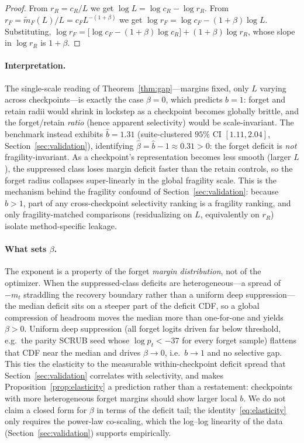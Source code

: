 \begin{proof}
From $r_R = c_R/L$ we get $\log L = \log c_R - \log r_R$. From
$r_F = \tilde m_F(L)/L = c_F L^{-(1+\beta)}$ we get
$\log r_F = \log c_F - (1+\beta)\log L$. Substituting,
$\log r_F = \bigl[\log c_F - (1+\beta)\log c_R\bigr] + (1+\beta)\log r_R$,
whose slope in $\log r_R$ is $1+\beta$.
\end{proof}

\paragraph{Interpretation.} The single-scale reading of
Theorem~\ref{thm:gap}---margins fixed, only $L$ varying across
checkpoints---is exactly the case $\beta = 0$, which predicts $b=1$: forget and
retain radii would shrink in lockstep as a checkpoint becomes globally
brittle, and the forget/retain \emph{ratio} (hence apparent selectivity) would
be scale-invariant. The benchmark instead exhibits $\hat b = 1.31$
(suite-clustered $95\%$ CI $[1.11,2.04]$, Section~\ref{sec:validation}),
identifying $\hat\beta = \hat b - 1 \approx 0.31 > 0$: the forget deficit is
\emph{not} fragility-invariant. As a checkpoint's representation becomes less
smooth (larger $L$), the suppressed class loses margin deficit faster than the
retain controls, so the forget radius collapses super-linearly in the global
fragility scale. This is the mechanism behind the fragility confound of
Section~\ref{sec:validation}: because $b>1$, part of any cross-checkpoint
selectivity ranking is a fragility ranking, and only fragility-matched
comparisons (residualizing on $L$, equivalently on $r_R$) isolate
method-specific leakage.

\paragraph{What sets $\beta$.} The exponent is a property of the forget
\emph{margin distribution}, not of the optimizer. When the suppressed-class
deficits are heterogeneous---a spread of $-m_t$ straddling the recovery
boundary rather than a uniform deep suppression---the median deficit sits on a
steeper part of the deficit CDF, so a global compression of headroom moves the
median more than one-for-one and yields $\beta>0$. Uniform deep suppression
(all forget logits driven far below threshold, e.g.\ the parity SCRUB seed
whose $\log p_t < -37$ for every forget sample) flattens that CDF near the
median and drives $\beta \to 0$, i.e.\ $b\to 1$ and no selective gap. This ties
the elasticity to the measurable within-checkpoint deficit spread that
Section~\ref{sec:validation} correlates with selectivity, and makes
Proposition~\ref{prop:elasticity} a prediction rather than a restatement:
checkpoints with more heterogeneous forget margins should show larger local
$b$. We do not claim a closed form for $\beta$ in terms of the deficit tail; the
identity~\eqref{eq:elasticity} only requires the power-law co-scaling, which the
log--log linearity of the data (Section~\ref{sec:validation}) supports
empirically.

